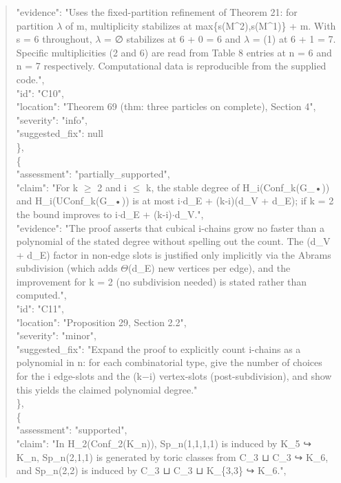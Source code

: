 \documentclass[11pt]{article}
\begin{document}
\begin{quote}
      "evidence": "Uses the fixed-partition refinement of Theorem 21: for partition \ensuremath{\lambda} of m, multiplicity stabilizes at max\{s(M\^{}2),s(M\^{}1)\} + m. With s = 6 throughout, \ensuremath{\lambda} = ∅ stabilizes at 6 + 0 = 6 and \ensuremath{\lambda} = (1) at 6 + 1 = 7. Specific multiplicities (2 and 6) are read from Table 8 entries at n = 6 and n = 7 respectively. Computational data is reproducible from the supplied code.",\\
      "id": "C10",\\
      "location": "Theorem 69 (thm: three particles on complete), Section 4",\\
      "severity": "info",\\
      "suggested\_fix": null\\
    \},\\
    \{\\
      "assessment": "partially\_supported",\\
      "claim": "For k \ensuremath{\ge} 2 and i \ensuremath{\le} k, the stable degree of H\_i(Conf\_k(G\_•)) and H\_i(UConf\_k(G\_•)) is at most i\ensuremath{\cdot}d\_E + (k-i)(d\_V + d\_E); if k = 2 the bound improves to i\ensuremath{\cdot}d\_E + (k-i)\ensuremath{\cdot}d\_V.",\\
      "evidence": "The proof asserts that cubical i-chains grow no faster than a polynomial of the stated degree without spelling out the count. The (d\_V + d\_E) factor in non-edge slots is justified only implicitly via the Abrams subdivision (which adds \ensuremath{\Theta}(d\_E) new vertices per edge), and the improvement for k = 2 (no subdivision needed) is stated rather than computed.",\\
      "id": "C11",\\
      "location": "Proposition 29, Section 2.2",\\
      "severity": "minor",\\
      "suggested\_fix": "Expand the proof to explicitly count i-chains as a polynomial in n: for each combinatorial type, give the number of choices for the i edge-slots and the (k\ensuremath{-}i) vertex-slots (post-subdivision), and show this yields the claimed polynomial degree."\\
    \},\\
    \{\\
      "assessment": "supported",\\
      "claim": "In H\_2(Conf\_2(K\_n)), Sp\_n(1,1,1,1) is induced by K\_5 ↪ K\_n, Sp\_n(2,1,1) is generated by toric classes from C\_3 ⊔ C\_3 ↪ K\_6, and Sp\_n(2,2) is induced by C\_3 ⊔ C\_3 ⊔ K\_\{3,3\} ↪ K\_6.",\\

\end{quote}
\end{document}
